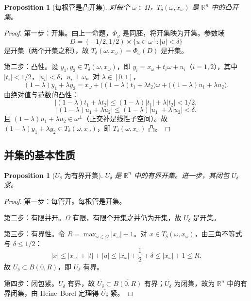 \documentclass[11pt,a4paper]{article}
\newtheorem{proposition}[theorem]{Proposition}
\theoremstyle{remark}
\begin{document}
	\begin{proposition}[每根管是凸开集]
		对每个 $\omega\in\Omega$，$T_\delta(\omega,x_\omega)$ 是 $\mathbb R^n$ 中的凸开集。
	\end{proposition}
	
	\begin{proof}
		第一步：开集。由上一命题，$\Phi_\omega$ 是同胚，将开集映为开集。参数域
		\[
		D=(-1/2,1/2)\times\{u\in\omega^\perp:|u|<\delta\}
		\]
		是开集（两个开集之积），故 $T_\delta(\omega,x_\omega)=\Phi_\omega(D)$ 是开集。
		
		第二步：凸性。设 $y_1,y_2\in T_\delta(\omega,x_\omega)$，即 $y_i=x_\omega+t_i\omega+u_i$（$i=1,2$），其中 $|t_i|<1/2$，$|u_i|<\delta$，$u_i\perp\omega$。对 $\lambda\in[0,1]$，
		\[
		(1-\lambda)y_1+\lambda y_2
		=x_\omega+\bigl((1-\lambda)t_1+\lambda t_2\bigr)\omega
		+\bigl((1-\lambda)u_1+\lambda u_2\bigr).
		\]
		由绝对值与范数的凸性：
		\[
		|(1-\lambda)t_1+\lambda t_2|\le(1-\lambda)|t_1|+\lambda|t_2|<1/2,
		\]
		\[
		|(1-\lambda)u_1+\lambda u_2|\le(1-\lambda)|u_1|+\lambda|u_2|<\delta.
		\]
		且 $(1-\lambda)u_1+\lambda u_2\in\omega^\perp$（正交补是线性子空间）。故 $(1-\lambda)y_1+\lambda y_2\in T_\delta(\omega,x_\omega)$，即 $T_\delta(\omega,x_\omega)$ 凸。
	\end{proof}
	
	\subsection{并集的基本性质}
	\begin{proposition}[$U_\delta$ 为有界开集]
		$U_\delta$ 是 $\mathbb R^n$ 中的有界开集。进一步，其闭包 $\overline{U_\delta}$ 紧。
	\end{proposition}
	
	\begin{proof}
		第一步：每管开。每根管是开集。
		
		第二步：有限并开。$\Omega$ 有限，有限个开集之并仍为开集，故 $U_\delta$ 是开集。
		
		第三步：有界性。令 $R=\max_{\omega\in\Omega}|x_\omega|+1$。对 $x\in T_\delta(\omega,x_\omega)$，由三角不等式与 $\delta\le1/2$：
		\[
		|x|\le|x_\omega|+|t|+|u|\le|x_\omega|+\frac12+\delta
		\le|x_\omega|+1\le R.
		\]
		故 $U_\delta\subset B(0,R)$，即 $U_\delta$ 有界。
		
		第四步：闭包紧。$U_\delta$ 有界，故 $\overline{U_\delta}\subset\overline{B(0,R)}$ 有界；$\overline{U_\delta}$ 为闭集，故为 $\mathbb R^n$ 中的有界闭集，由 Heine--Borel 定理得 $\overline{U_\delta}$ 紧。
	\end{proof}
	
\end{document}
